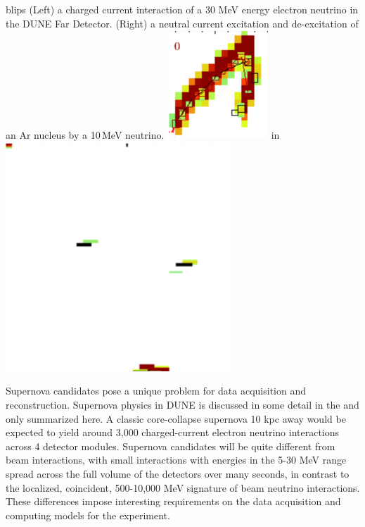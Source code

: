 \documentclass[../main-v1.tex]{subfiles}
\begin{document}
\begin{dunefigure}
{blips} %
{(Left) a charged current interaction of a 30 MeV energy electron neutrino in the DUNE Far Detector.  (Right) a neutral current excitation and de-excitation of an Ar nucleus by a 10\,MeV neutrino.}
 \includegraphics[height=0.3\textwidth]{graphics/IntroFigures/Fig_10a_Picture3.png}  in
\includegraphics[height=0.5\textwidth]{graphics/IntroFigures/Fig_10b_Picture4.png}
\end{dunefigure}

Supernova candidates pose a unique problem for data acquisition and reconstruction.  Supernova physics in DUNE is discussed in some detail in the \cite{ Abi:2020evt} and only summarized here. A classic core-collapse supernova 10 kpc away would be expected to yield around 3,000  charged-current electron neutrino interactions across 4 detector modules. Supernova candidates will be quite different from beam interactions, with small interactions with energies in the 5-30 MeV range spread across the full volume of the detectors over many seconds, in contrast to the localized, coincident,  500-10,000 MeV signature of beam neutrino interactions. These differences impose interesting requirements on the data acquisition and computing models for the experiment.  
\end{document}
